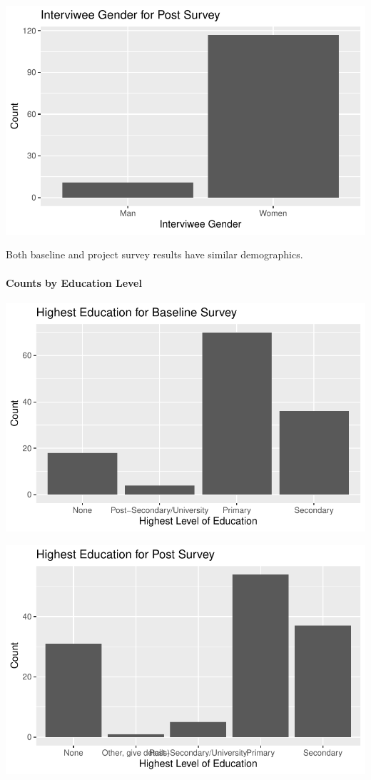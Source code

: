 \documentclass[
  letterpaper,
  DIV=11,
  numbers=noendperiod]{scrartcl}
\let\oldparagraph\paragraph
\renewcommand{\paragraph}[1]{\oldparagraph{#1}\mbox{}}
\begin{document}
\includegraphics{report_files/figure-pdf/unnamed-chunk-17-1.pdf}

Both baseline and project survey results have similar demographics.

\hypertarget{counts-by-education-level}{%
\paragraph{Counts by Education Level}\label{counts-by-education-level}}

\includegraphics{report_files/figure-pdf/unnamed-chunk-18-1.pdf}

\includegraphics{report_files/figure-pdf/unnamed-chunk-19-1.pdf}
\end{document}
